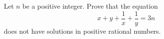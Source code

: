 Let $n$ be a positive integer. Prove that the equation
\[x+y+\frac{1}{x}+\frac{1}{y}=3n\]
does not have solutions in positive rational numbers.